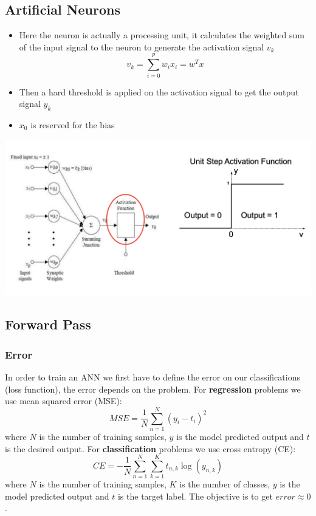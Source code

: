 \documentclass[11pt]{article}
\begin{document}
\subsection{Artificial Neurons}
\begin{itemize}
\item Here the neuron is actually a processing unit, it calculates the weighted sum of the input signal to the neuron to generate the activation signal $v_k$
$$ v_k = \sum_{i=0}^p w_i x_i = w^Tx$$
\item Then a hard threshold is applied on the activation signal to get the output signal $y_k$
\item $x_0$ is reserved for the bias
\end{itemize}
\begin{center}
\includegraphics[scale=0.58]{images/artneuron.png}
\end{center}
\subsection{Forward Pass}
\subsubsection{Error}
In order to train an ANN we first have to define the error on our classifications (loss function),  the error depends on the problem.  For \textbf{regression} problems we use mean squared error (MSE):
$$ MSE = \frac{1}{N} \sum_{n=1}^N (y_i - t_i)^2 $$
where $N$ is the number of training samples, $y$ is the model predicted output and $t$ is the desired output. For \textbf{classification} problems we use cross entropy (CE):
$$ CE = -\frac{1}{N} \sum_{n=1}^N \sum_{k=1}^K t_{n,k} \log (y_{n,k}) $$ 
where $N$ is the number of training samples, $K$ is the number of classes, $y$ is the model predicted output and $t$ is the target label. The objective is to get $error \approx 0$.
\end{document}
